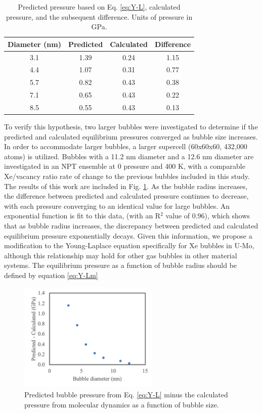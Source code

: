 \documentclass[review]{elsarticle}
\begin{document}
\begin{table}[h!]
\caption{Predicted pressure based on Eq. \ref{eq:Y-L}, calculated pressure, and the subsequent difference. Units of pressure in GPa. }
\label{tab:press_diff}
\begin{center}
\begin{tabular}{|c|c|c|c|}
     \hline
Diameter (nm) & Predicted & Calculated & Difference \\
\hline
3.1 & 1.39 & 0.24 & 1.15 \\
4.4 & 1.07 & 0.31 & 0.77 \\
5.7 & 0.82 & 0.43 & 0.38 \\
7.1 & 0.65 & 0.43 & 0.22 \\
8.5 & 0.55 & 0.43 & 0.13 \\
     \hline
\end{tabular}
\end{center}
\label{default}
\end{table}%

To verify this hypothesis, two larger bubbles were investigated to determine if the predicted and calculated equilibrium pressures converged as bubble size increases. In order to accommodate larger bubbles, a larger supercell (60x60x60, 432,000 atoms) is utilized. Bubbles with a 11.2 nm diameter and a 12.6 nm diameter are investigated in an NPT ensemble at 0 pressure and 400 K, with a comparable Xe/vacancy ratio rate of change to the previous bubbles included in this study. The results of this work are included in Fig. \ref{fig:press_diff}. As the bubble radius increases, the difference between predicted and calculated pressure continues to decrease, with each pressure converging to an identical value for large bubbles. An exponential function is fit to this data, (with an R$^2$ value of 0.96), which shows that as bubble radius increases, the discrepancy between predicted and calculated equilibrium pressure exponentially decays. Given this information, we propose a modification to the Young-Laplace equation specifically for Xe bubbles in U-Mo, although this relationship may hold for other gas bubbles in other material systems. The equilibrium pressure as a function of bubble radius should be defined by equation \ref{eq:Y-Lm}

\begin{figure}[h]
 \centering
 \includegraphics[width=0.6\textwidth]{6_press_diff.png} 
 \caption{Predicted bubble pressure from Eq. \ref{eq:Y-L} minus the calculated pressure from molecular dynamics as a function of bubble size.}
 \label{fig:press_diff}
\end{figure}
\end{document}
